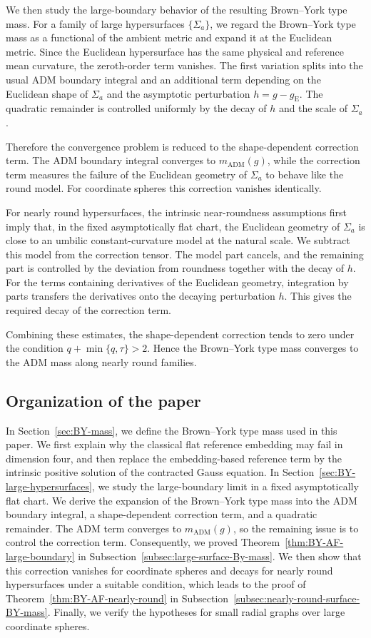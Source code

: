 \documentclass[10pt]{amsart}
\newcommand{\gE}{g_{\mathrm{E}}}
\newcommand{\ADM}{\mathrm{ADM}}
\theoremstyle{plain}
\theoremstyle{remark}
\begin{document}
	We then study the large-boundary behavior of the resulting Brown--York type
	mass. For a family of large hypersurfaces $\{\Sigma_a\}$, we regard the
	Brown--York type mass as a functional of the ambient metric and expand it at
	the Euclidean metric. Since the Euclidean hypersurface has the same physical
	and reference mean curvature, the zeroth-order term vanishes. The first
	variation splits into the usual ADM boundary integral and an additional term
	depending on the Euclidean shape of $\Sigma_a$ and the asymptotic perturbation
	$h=g-\gE$. The quadratic remainder is controlled uniformly by the decay of $h$
	and the scale of $\Sigma_a$.
	
	Therefore the convergence problem is reduced to the shape-dependent correction
	term. The ADM boundary integral converges to $m_{\ADM}(g)$, while the correction
	term measures the failure of the Euclidean geometry of $\Sigma_a$ to behave like
	the round model. For coordinate spheres this correction vanishes identically.
	
	For nearly round hypersurfaces, the intrinsic near-roundness assumptions first
	imply that, in the fixed asymptotically flat chart, the Euclidean geometry of
	$\Sigma_a$ is close to an umbilic constant-curvature model at the natural
	scale. We subtract this model from the correction tensor. The model part
	cancels, and the remaining part is controlled by the deviation from roundness
	together with the decay of $h$. For the terms containing derivatives of the
	Euclidean geometry, integration by parts transfers the derivatives onto the
	decaying perturbation $h$. This gives the required decay of the correction
	term.
	
	Combining these estimates, the shape-dependent correction tends to zero under
	the condition $q+\min\{q,\tau\}>2$. Hence the Brown--York type mass converges
	to the ADM mass along nearly round families.
	
	\subsection{Organization of the paper}
	
	In Section~\ref{sec:BY-mass}, we define the Brown--York type mass used in this paper. We first explain why the classical flat reference embedding may fail in dimension four, and then replace the embedding-based reference term by the intrinsic positive solution of the contracted Gauss equation. In Section~\ref{sec:BY-large-hypersurfaces}, we study the large-boundary limit in a fixed asymptotically flat chart. We derive the expansion of the Brown--York type mass into the ADM boundary integral, a shape-dependent correction term, and a quadratic remainder. The ADM term converges to $m_{\ADM}(g)$, so the remaining issue is to control the correction term. Consequently, we proved Theorem~\ref{thm:BY-AF-large-boundary} in Subsection~\ref{subsec:large-surface-By-mass}. We then show that this correction vanishes for coordinate spheres and decays for nearly round hypersurfaces under a suitable condition, which leads to the proof of Theorem~\ref{thm:BY-AF-nearly-round} in Subsection~\ref{subsec:nearly-round-surface-BY-mass}. Finally, we verify the hypotheses for small radial graphs over large coordinate spheres.
	
\end{document}
